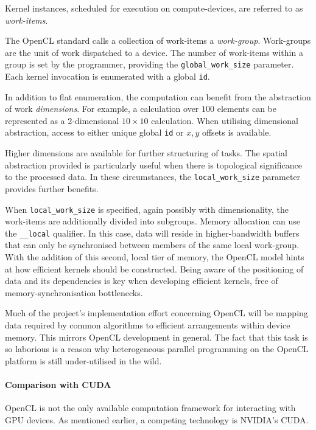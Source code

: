 Kernel instances, scheduled for execution on compute-devices, are referred to as \emph{work-items}.

The \ac{OpenCL} standard calls a collection of work-items a \emph{work-group}. Work-groups are the unit of work dispatched to a device. The number of work-items within a group is set by the programmer, providing the \verb|global_work_size| parameter. Each kernel invocation is enumerated with a global \verb|id|. 

In addition to flat enumeration, the computation can benefit from the abstraction of work \emph{dimensions}. For example, a calculation over $100$ elements can be represented as a 2-dimensional $10 \times 10$ calculation. When utilising dimensional abstraction, access to either unique global \verb|id| or $x, y$ offsets is available.

Higher dimensions are available for further structuring of tasks. The spatial abstraction provided is particularly useful when there is topological significance to the processed data. In these circumstances, the \verb|local_work_size| parameter provides further benefits.

When \verb|local_work_size| is specified, again possibly with dimensionality, the work-items are additionally divided into subgroups. Memory allocation can use the \verb|__local| qualifier. In this case, data will reside in higher-bandwidth buffers that can only be synchronised between members of the same local work-group. With the addition of this second, local tier of memory, the \ac{OpenCL} model hints at how efficient kernels should be constructed. Being aware of the positioning of data and its dependencies is key when developing efficient kernels, free of memory-synchronisation bottlenecks.

Much of the project's implementation effort concerning \ac{OpenCL} will be mapping data required by common algorithms to efficient arrangements within device memory. This mirrors \ac{OpenCL} development in general.
The fact that this task is so laborious is a reason why heterogeneous parallel programming on the \ac{OpenCL} platform is still under-utilised in the wild.

\paragraph*{Comparison with CUDA}
\ac{OpenCL} is not the only available computation framework for interacting with \ac{GPU} devices. As mentioned earlier, a competing technology is NVIDIA's \ac{CUDA}.

